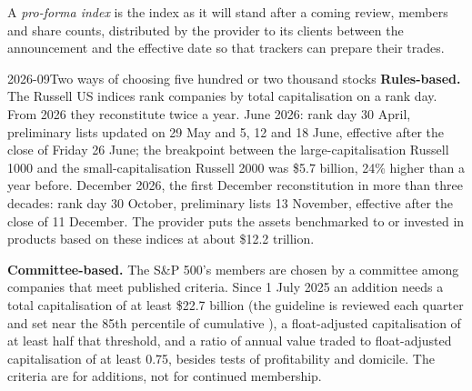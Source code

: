 \begin{definition}\label{def:m1:index-construction-and-rebalancing:proforma}
A \emph{pro-forma index} is the index as it will
stand after a coming review, members and share counts, distributed by the
provider to its clients between the announcement and the effective date so
that trackers can prepare their trades.
\end{definition}

\begin{dated}{2026-09}{Two ways of choosing five hundred or two thousand stocks}\label{dat:m1:index-construction-and-rebalancing:rules}
\textbf{Rules-based.} The Russell US indices rank companies by total
capitalisation on a rank day. From 2026 they reconstitute twice a year. June
2026: rank day 30 April, preliminary lists updated on 29 May and 5, 12 and 18
June, effective after the close of Friday 26 June; the breakpoint between the
large-capitalisation Russell 1000 and the small-capitalisation Russell 2000
was \$5.7 billion, 24\% higher than a year before. December 2026, the first
December reconstitution in more than three decades: rank day 30 October,
preliminary lists 13 November, effective after the close of 11 December.
The provider puts the assets benchmarked to or invested in products based on
these indices at about \$12.2 trillion.

\textbf{Committee-based.} The S\&P 500's members are chosen by a committee
among companies that meet published criteria. Since 1 July 2025 an addition
needs a total capitalisation of at least \$22.7 billion (the guideline is
reviewed each quarter and set near the 85th percentile of cumulative ), a float-adjusted capitalisation of at least half that
threshold, and a ratio of annual value traded to float-adjusted
capitalisation of at least 0.75, besides tests of profitability and
domicile. The criteria are for additions, not for continued membership.
\end{dated}

